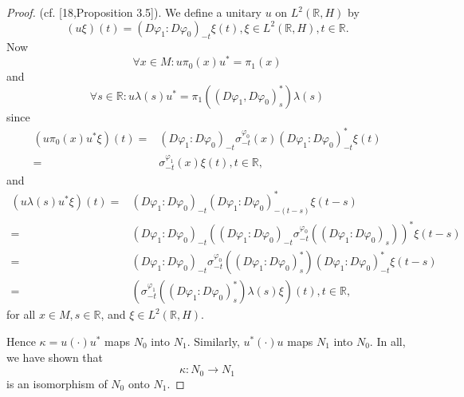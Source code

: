 \begin{proof}
    (cf. [18,Proposition 3.5]). We define a unitary $u$ on $L^2(\mathbb{R},H)$ by
    \[
        (u\xi)(t)=(D\varphi_1:D\varphi_0)_{-t}\xi(t),\xi\in L^2(\mathbb{R},H), t\in \mathbb{R}.
    \]
    Now
    \begin{equation}
        \forall x\in M: u\pi_0(x)u^*=\pi_1(x)
    \end{equation}
    and
    \begin{equation}
        \forall s\in \mathbb{R}:u\lambda(s)u^*=\pi_1((D\varphi_1,D\varphi_0)_s^*)\lambda(s)
    \end{equation}
    since
    \[
        \begin{split}
            (u\pi_0(x)u^*\xi)(t)=&(D\varphi_1:D\varphi_0)_{-t}\sigma_{-t}^{\varphi_0}(x)(D\varphi_1:D\varphi_0)_{-t}^*\xi(t)\\
            =&\sigma_{-t}^{\varphi_1}(x)\xi(t),t\in \mathbb{R},
        \end{split}
    \]
    and
    \[
        \begin{split}
            (u\lambda(s)u^* \xi)(t)=&(D\varphi_1:D\varphi_0)_{-t}(D\varphi_1:D\varphi_0)_{-(t-s)}^*\xi(t-s)\\
            =&(D\varphi_1:D\varphi_0)_{-t}((D\varphi_1:D\varphi_0)_{-t}\sigma_{-t}^{\varphi_0}((D\varphi_1:D\varphi_0)_{s}))^*\xi(t-s)\\
            =&(D\varphi_1:D\varphi_0)_{-t}\sigma_{-t}^{\varphi_0}((D\varphi_1:D\varphi_0)_{s}^*)(D\varphi_1:D\varphi_0)_{-t}^*\xi(t-s)\\
            =&(\sigma_{-t}^{\varphi_1}((D\varphi_1:D\varphi_0)_{s}^*)\lambda(s)\xi)(t),t\in \mathbb{R},
        \end{split}
    \]
    for all $x\in M,s\in \mathbb{R}$, and $\xi\in L^2(\mathbb{R},H)$.\par
    Hence $\kappa=u(\cdot)u^*$ maps $N_0$ into $N_1$. Similarly, $u^*(\cdot)u$ maps $N_1$ into $N_0$. In all, we have shown that
    \[
        \kappa:N_0\to N_1
    \]
    {\color{red} is} an isomorphism of $N_0$ onto $N_1$.
\end{proof}
% 